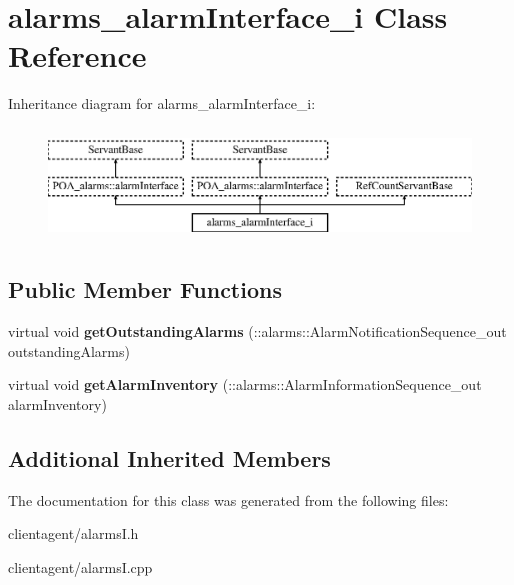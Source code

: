 \section{alarms\+\_\+alarm\+Interface\+\_\+i Class Reference}
\label{classalarms__alarmInterface__i}
Inheritance diagram for alarms\+\_\+alarm\+Interface\+\_\+i\+:\begin{figure}[H]
\begin{center}
\leavevmode
\includegraphics[height=3.000000cm]{classalarms__alarmInterface__i}
\end{center}
\end{figure}
\subsection*{Public Member Functions}
\begin{DoxyCompactItemize}
\item 
virtual void {\bfseries get\+Outstanding\+Alarms} (\+::alarms\+::\+Alarm\+Notification\+Sequence\+\_\+out outstanding\+Alarms)\label{classalarms__alarmInterface__i_a679c03ee5b5c973d3886c1a1c85024d5}

\item 
virtual void {\bfseries get\+Alarm\+Inventory} (\+::alarms\+::\+Alarm\+Information\+Sequence\+\_\+out alarm\+Inventory)\label{classalarms__alarmInterface__i_aa476d9adb7bd0e355a5b4414aee026c8}

\end{DoxyCompactItemize}
\subsection*{Additional Inherited Members}


The documentation for this class was generated from the following files\+:\begin{DoxyCompactItemize}
\item 
clientagent/alarms\+I.\+h\item 
clientagent/alarms\+I.\+cpp\end{DoxyCompactItemize}
